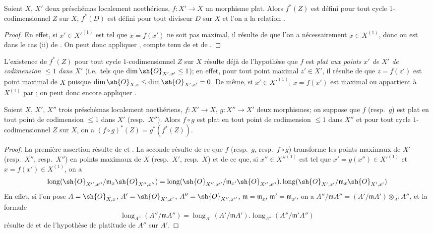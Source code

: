 \begin{proposition}[21.10.6]
\label{IV.21.10.6}
Soient $X$, $X'$ deux préschémas localement noethériens, $f:X'\to X$ un morphisme plat.
Alors $f^*(Z)$ est défini pour tout cycle $1$-codimensionnel $Z$ sur $X$, $f^*(D)$ est défini pour tout diviseur $D$ sur $X$ et l'on a la relation .
\end{proposition}

\begin{proof}
En effet, si $x'\in X'^{(1)}$ est tel que $x=f(x')$ ne soit pas maximal, il résulte de  que l'on a nécessairement $x\in X^{(1)}$, donc on est dans le cas (ii) de .
On peut donc appliquer , compte tenu de  et de .
\end{proof}

\begin{remark}[21.10.7]
\label{IV.21.10.7}
L'existence de $f^*(Z)$ pour tout cycle $1$-codimensionnel $Z$ sur $X$ résulte déjà de l'hypothèse que $f$ est \emph{plat aux points $x'$ de $X'$ de codimension $\leq1$ dans $X'$} (i.e.\ tels que $\dim\sh{O}_{X',x'}\leq1$);
en effet, pour tout point maximal $z'\in X'$, il résulte de  que $z=f(z')$ est point maximal de $X$ puisque $\dim\sh{O}_{X,z}\leq\dim\sh{O}_{X',z'}=0$.
De même, si $x'\in X'^{(1)}$, $x=f(x')$ est maximal ou appartient à $X^{(1)}$ par ;
on peut donc encore appliquer .
\end{remark}

\begin{proposition}[21.10.8]
\label{IV.21.10.8}
Soient $X$, $X'$, $X''$ trois préschémas localement noethériens, $f:X'\to X$, $g:X''\to X'$ deux morphismes;
on suppose que $f$ \textup{(resp.\ $g$)} est plat en tout point de codimension $\leq1$ dans $X'$ \textup{(resp.\ $X''$)}.
Alors $f\circ g$ est plat en tout point de codimension $\leq1$ dans $X''$ et pour tout cycle $1$-codimensionnel $Z$ sur $X$, on a $(f\circ g)^*(Z)=g^*(f^*(Z))$.
\end{proposition}

\begin{proof}
La première assertion résulte de  et .
La seconde résulte de ce que $f$ (resp.\ $g$, resp.\ $f\circ g$) transforme les points maximaux de $X'$ (resp.\ $X''$, resp.\ $X''$) en points maximaux de $X$ (resp.\ $X'$, resp.\ $X$) et de ce que, si $x''\in X''^{(1)}$ est tel que $x'=g(x'')\in X'^{(1)}$ et $x=f(x')\in X^{(1)}$, on a
\[
  \operatorname{long}(\sh{O}_{X'',x''}/\mathfrak{m}_x\sh{O}_{X'',x''})
  =\operatorname{long}(\sh{O}_{X'',x''}/\mathfrak{m}_{x'}\sh{O}_{X'',x''})
   .\operatorname{long}(\sh{O}_{X',x'}/\mathfrak{m}_x\sh{O}_{X',x'})
\]
En effet, si l'on pose $A=\sh{O}_{X,x}$, $A'=\sh{O}_{X',x'}$, $A''=\sh{O}_{X'',x''}$, $\mathfrak{m}=\mathfrak{m}_x$, $\mathfrak{m}'=\mathfrak{m}_{x'}$, on a $A''/\mathfrak{m}A''=(A'/\mathfrak{m}A')\otimes_{A'}A''$, et la formule
\[
  \operatorname{long}_{A''}(A''/\mathfrak{m}A'')
  =\operatorname{long}_{A'}(A'/\mathfrak{m}A')
   .\operatorname{long}_{A''}(A''/\mathfrak{m}'A'')
\]
résulte de  et de l'hypothèse de platitude de $A''$ sur $A'$.
\end{proof}

